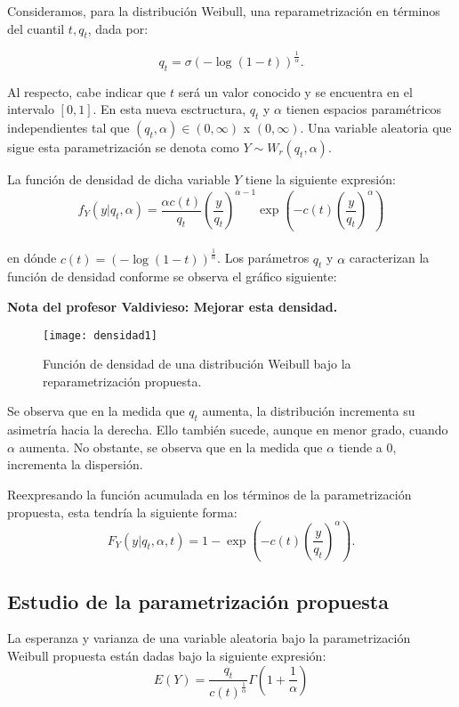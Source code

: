 Consideramos, para la distribución Weibull, una reparametrización en términos del cuantil $t, q_{t}$, dada por:

\[q_{t}=\sigma\left( -\log\left( 1-t \right) \right)^{\frac{1}{\alpha}}.\]

Al respecto, cabe indicar que $t$ será un valor conocido y se encuentra en el intervalo $[0,1]$. En esta nueva esctructura, $q_{t}$ y $\alpha$ tienen espacios paramétricos independientes tal que $(q_{t},\alpha) \in (0,\infty)$ x $(0,\infty)$. Una variable aleatoria que sigue esta parametrización se denota como $Y \sim W_{r}(q_{t},\alpha)$.

La función de densidad de dicha variable $Y$ tiene la siguiente expresión:
\begin{equation}
f_{Y}(y| q_{t},\alpha)=\frac{\alpha c(t)}{q_{t}}\left( \frac{y}{q_{t}} \right)^{\alpha-1}\exp\left( -c(t)\left( \frac{y}{q_{t}} \right)^{\alpha} \right)
\end{equation}
\\
\noindent en dónde $c(t)= \left( -\log(1-t) \right)^{\frac{1}{\alpha}}$. Los parámetros $q_{t}$ y $\alpha$ caracterizan la función de densidad conforme se observa el gráfico siguiente:

\textbf{Nota del profesor Valdivieso: Mejorar esta densidad.}

\begin{figure}[H]
\texttt{[image: densidad1]}
\caption{Función de densidad de una distribución Weibull bajo la reparametrización propuesta.}
\end{figure}

\noindent Se observa que en la medida que $q_{t}$ aumenta, la distribución incrementa su asimetría hacia la derecha. Ello también sucede, aunque en menor grado, cuando $\alpha$ aumenta. No obstante, se observa que en la medida que $\alpha$ tiende a 0, incrementa la dispersión.

Reexpresando la función acumulada en los términos de la parametrización propuesta, esta tendría la siguiente forma:
\begin{equation} \label{eq:1}
F_{Y}\left(y| q_{t},\alpha,t \right)=1-\exp\left( -c(t)\left( \frac{y}{q_{t}} \right)^{\alpha} \right).
\end{equation}
\subsection{Estudio de la parametrización propuesta}

La esperanza y varianza de una variable aleatoria bajo la parametrización Weibull propuesta están dadas bajo la siguiente expresión:
\begin{equation}
E(Y)=\frac{q_{t}}{c(t)^{\frac{1}{\alpha}}}\Gamma\left( 1+\frac{1}{\alpha} \right)
\end{equation}

